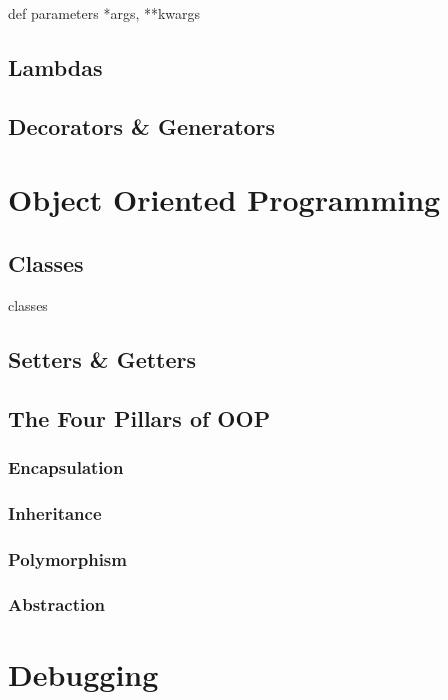 \documentclass[10pt]{article}
\begin{document}
    def
    parameters
    *args, **kwargs

  \subsection{Lambdas}

  \subsection{Decorators \& Generators}

\section{Object Oriented Programming}

  \subsection{Classes}

    classes

  \subsection{Setters \& Getters}

  \subsection{The Four Pillars of OOP}

    \subsubsection{Encapsulation}

    \subsubsection{Inheritance}

    \subsubsection{Polymorphism}

    \subsubsection{Abstraction}

\section{Debugging}
\end{document}
